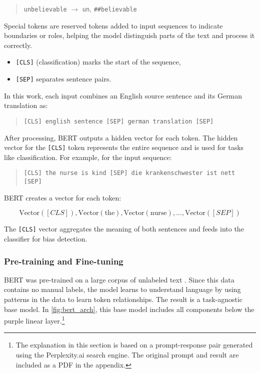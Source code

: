 \begin{quote}
    \texttt{unbelievable} $\rightarrow$ \texttt{un}, \texttt{\#\#believable}
\end{quote}

\noindent Special tokens are reserved tokens added to input sequences to indicate boundaries or roles, helping the model distinguish parts of the text and process it correctly.

\begin{itemize}
	\item \texttt{[CLS]} (classification) marks the start of the sequence,
	\item \texttt{[SEP]} separates sentence pairs.
\end{itemize}

\noindent In this work, each input combines an English source sentence and its German translation as:

\begin{quote}
    \texttt{[CLS] english sentence [SEP] german translation [SEP]}
\end{quote}

\noindent After processing, BERT outputs a hidden vector for each token. The hidden vector for the \texttt{[CLS]} token represents the entire sequence and is used for tasks like classification. For example, for the input sequence:

\begin{quote}
\texttt{[CLS] the nurse is kind [SEP] die krankenschwester ist nett [SEP]}
\end{quote}

\noindent BERT creates a vector for each token:

\[
\text{Vector}([CLS]), \text{Vector}(\text{the}), \text{Vector}(\text{nurse}), \ldots, \text{Vector}([SEP])
\]

\noindent The \texttt{[CLS]} vector aggregates the meaning of both sentences and feeds into the classifier for bias detection.


\subsubsection{Pre-training and Fine-tuning}
BERT was pre-trained on a large corpus of unlabeled text \citep{devlinBERTPretrainingDeep2019}. Since this data contains no manual labels, the model learns to understand language by using patterns in the data to learn token relationships. The result is a task-agnostic base model. In \autoref{fig:bert_arch}, this base model includes all components below the purple linear layer.\footnote{The explanation in this section is based on a prompt-response pair generated using the Perplexity.ai search engine. The original prompt and result are included as a PDF in the appendix.}

